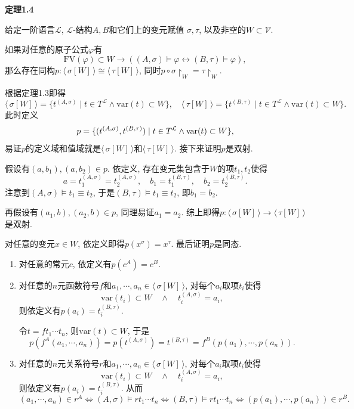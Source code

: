 \newpage

\hypertarget{sec:定理1.4}{}
\noindent\textbf{定理1.4}

给定一阶语言$\mathcal{L}$, $\mathcal{L}$-结构$A,B$和它们上的变元赋值
$\sigma,\tau$, 以及非空的$W\subset\mathcal{V}$.

如果对任意的原子公式$\varphi$有
\[
    \mathrm{FV}(\varphi)\subset W\to
    ((A,\sigma)\models\varphi\leftrightarrow(B,\tau)\models\varphi),
\]
那么存在同构$p:\langle\,\sigma[W]\,\rangle\cong\langle\,\tau[W]\,\rangle$,
同时$p\circ\sigma\!\restriction_W=\tau\!\restriction_W$.


根据定理1.3即得
\[
    \langle\,\sigma[W]\,\rangle=\{t^{(A,\sigma)}\mid
    t\in T^{\mathcal{L}}\land\mathrm{var}(t)\subset W\},\quad
    \langle\,\tau[W]\,\rangle=\{t^{(B,\tau)}\mid
    t\in T^{\mathcal{L}}\land\mathrm{var}(t)\subset W\}.
\]
此时定义
\vspace{-3pt}
\[
    p=\{(t^{(A,\sigma)},t^{(B,\tau)})\mid
    t\in T^{\mathcal{L}}\land\mathrm{var}(t)\subset W\},\\[-3pt]
\]
易证$p$的定义域和值域就是$\langle\,\sigma[W]\,\rangle$和$\langle\,\tau[W]\,\rangle$.
接下来证明$p$是双射.

假设有$(a,b_1),(a,b_2)\in p$. 依定义, 存在变元集包含于$W$的项$t_1,t_2$使得
\[
    a=t_1^{(A,\sigma)}=t_2^{(A,\sigma)},\quad
    b_1=t_1^{(B,\tau)},\quad b_2=t_2^{(B,\tau)}.
\]
注意到$(A,\sigma)\models t_1\equiv t_2$,
于是$(B,\tau)\models t_1\equiv t_2$, 即$b_1=b_2$.

再假设有$(a_1,b),(a_2,b)\in p$, 同理易证$a_1=a_2$.
综上即得$p:\langle\,\sigma[W]\,\rangle\to\langle\,\tau[W]\,\rangle$是双射.

对任意的变元$x\in W$, 依定义即得$p(x^\sigma)=x^{\tau}$. 最后证明$p$是同态.

\begin{enumerate}
    \item 对任意的常元$c$, 依定义有$p(c^A)=c^B$.
    
    \item 对任意的$n$元函数符号$f$和$a_1,\cdots,a_n\in\langle\,\sigma[W]\,\rangle$,
    对每个$a_i$取项$t_i$使得
    \[
        \mathrm{var}(t_i)\subset W\quad\land\quad t_i^{(A,\sigma)}=a_i,
    \]
    则依定义有$p(a_i)=t_i^{(B,\tau)}$.

    \hspace{2.17em}
    令$t=ft_1\cdots t_n$, 则$\mathrm{var}(t)\subset W$, 于是
    \[
        p(f^A(a_1,\cdots,a_n))=p(t^{(A,\sigma)})
        =t^{(B,\tau)}=f^B(p(a_1),\cdots,p(a_n)).
    \]

    \item 对任意的$n$元关系符号$r$和$a_1,\cdots,a_n\in\langle\,\sigma[W]\,\rangle$,
    对每个$a_i$取项$t_i$使得
    \[
        \mathrm{var}(t_i)\subset W\quad\land\quad t_i^{(A,\sigma)}=a_i,
    \]
    则依定义有$p(a_i)=t_i^{(B,\tau)}$. 从而
    \begin{equation*}
        (a_1,\cdots,a_n)\in r^A\iff(A,\sigma)\models rt_1\cdots t_n\iff
        (B,\tau)\models rt_1\cdots t_n\iff(p(a_1),\cdots,p(a_n))\in r^B.
    \tag*{\qedsymbol}\end{equation*}
\end{enumerate}


